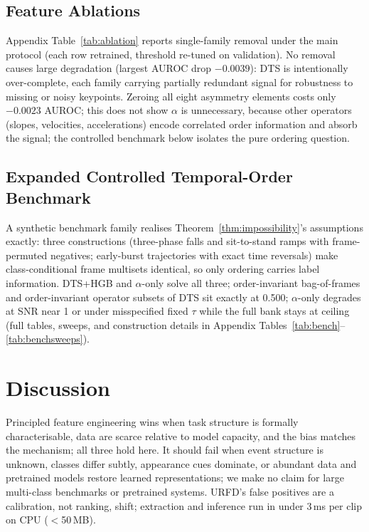 \subsection{Feature Ablations}
Appendix Table~\ref{tab:ablation} reports single-family removal under the main protocol (each row retrained, threshold re-tuned on validation). No removal causes large degradation (largest AUROC drop $-0.0039$): DTS is intentionally over-complete, each family carrying partially redundant signal for robustness to missing or noisy keypoints. Zeroing all eight asymmetry elements costs only $-0.0023$ AUROC; this does not show $\alpha$ is unnecessary, because other operators (slopes, velocities, accelerations) encode correlated order information and absorb the signal; the controlled benchmark below isolates the pure ordering question.

\subsection{Expanded Controlled Temporal-Order Benchmark}
A synthetic benchmark family realises Theorem~\ref{thm:impossibility}'s assumptions exactly: three constructions (three-phase falls and sit-to-stand ramps with frame-permuted negatives; early-burst trajectories with exact time reversals) make class-conditional frame multisets identical, so only ordering carries label information. DTS+HGB and $\alpha$-only solve all three; order-invariant bag-of-frames and order-invariant operator subsets of DTS sit exactly at 0.500; $\alpha$-only degrades at SNR near 1 or under misspecified fixed $\tau$ while the full bank stays at ceiling (full tables, sweeps, and construction details in Appendix Tables~\ref{tab:bench}--\ref{tab:benchsweeps}).

\section{Discussion}
Principled feature engineering wins when task structure is formally characterisable, data are scarce relative to model capacity, and the bias matches the mechanism; all three hold here. It should fail when event structure is unknown, classes differ subtly, appearance cues dominate, or abundant data and pretrained models restore learned representations; we make no claim for large multi-class benchmarks or pretrained systems. URFD's false positives are a calibration, not ranking, shift; extraction and inference run in under 3\,ms per clip on CPU ($<$50\,MB).

